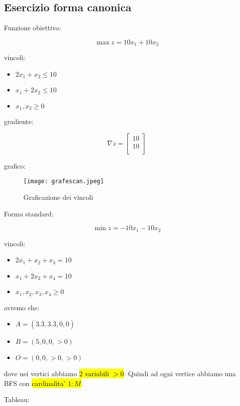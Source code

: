 \subsection{Esercizio forma canonica}

Funzione obiettivo:

$$\max z = 10x_1 + 10x_2$$

vincoli:

\begin{itemize}
	\item $2x_1 + x_2 \leq 10$
	\item $x_1 + 2x_2 \leq 10$
	\item $x_1, x_2 \geq 0$
\end{itemize}

gradiente:

$$\nabla z =
\left[ {\begin{array}{c}
	10 \\
	10 \\
\end{array} } \right]
$$

grafico:

\begin{figure}[H]
\centering
\texttt{[image: grafescan.jpeg]}
\caption{Graficazione dei vincoli} 
\label{grafescan}
\end{figure}

Forma standard:

$$\min z = -10x_1 - 10x_2$$

vincoli:

\begin{itemize}
	\item $2x_1 + x_2 + x_3 = 10$
	\item $x_1 + 2x_2 + x_4 = 10$
	\item $x_1, x_2, x_3, x_4 \geq 0$
\end{itemize}

avremo che:

\begin{itemize}
	\item $A = (3.\overline{3}, 3.\overline{3}, 0, 0)$
	\item $B = (5, 0, 0, > 0)$
	\item $O = (0, 0, > 0, > 0)$
\end{itemize}

dove nei vertici abbiamo \hl{2 variabili $> 0$}. Quindi ad ogni vertice abbiamo una BFS con \hl{cardinalita' $1:M$}.

Tableau:

